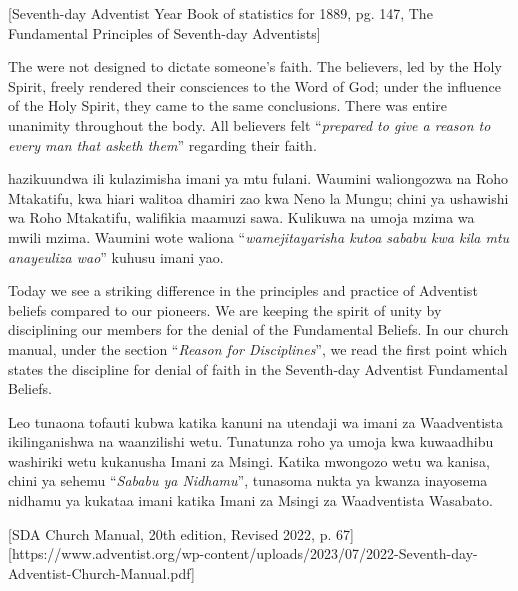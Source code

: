 [Seventh-day Adventist Year Book of statistics for 1889, pg. 147, The Fundamental Principles of Seventh-day Adventists]


The  were not designed to dictate someone’s faith. The believers, led by the Holy Spirit, freely rendered their consciences to the Word of God; under the influence of the Holy Spirit, they came to the same conclusions. There was entire unanimity throughout the body. All believers felt “\textit{prepared to give a reason to every man that asketh them}” regarding their faith.


 hazikuundwa ili kulazimisha imani ya mtu fulani. Waumini waliongozwa na Roho Mtakatifu, kwa hiari walitoa dhamiri zao kwa Neno la Mungu; chini ya ushawishi wa Roho Mtakatifu, walifikia maamuzi sawa. Kulikuwa na umoja mzima wa mwili mzima. Waumini wote waliona “\textit{wamejitayarisha kutoa sababu kwa kila mtu anayeuliza wao}” kuhusu imani yao.


Today we see a striking difference in the principles and practice of Adventist beliefs compared to our pioneers. We are keeping the spirit of unity by disciplining our members for the denial of the Fundamental Beliefs. In our church manual, under the section “\textit{Reason for Disciplines}”, we read the first point which states the discipline for denial of faith in the Seventh-day Adventist Fundamental Beliefs.


Leo tunaona tofauti kubwa katika kanuni na utendaji wa imani za Waadventista ikilinganishwa na waanzilishi wetu. Tunatunza roho ya umoja kwa kuwaadhibu washiriki wetu kukanusha Imani za Msingi. Katika mwongozo wetu wa kanisa, chini ya sehemu “\textit{Sababu ya Nidhamu}”, tunasoma nukta ya kwanza inayosema nidhamu ya kukataa imani katika Imani za Msingi za Waadventista Wasabato.






[SDA Church Manual, 20th edition, Revised 2022, p. 67][https://www.adventist.org/wp-content/uploads/2023/07/2022-Seventh-day-Adventist-Church-Manual.pdf]



